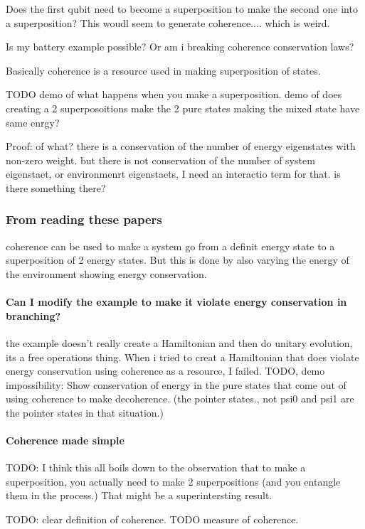 \documentclass{article}
\begin{document}
Does the first qubit need to become a superposition to make the second one into a superposition?
This woudl seem to generate coherence.... which is weird.

Is my battery example possible? Or am i breaking coherence conservation laws?



Basically coherence is a resource used in making superposition of states. 

TODO demo of what happens when you make a superposition. demo of does creating a 2 superposoitions make the 2 pure states making the mixed state have same enrgy? 


Proof: of what?
there is a conservation of the number of energy eigenstates with non-zero weight. but there is not conservation of the number of system eigenstaet, or environmenrt eigenstaets, I need an interactio term for that. is there something there?

\subsubsection{From reading these papers}
coherence can be used to make a system go from a definit energy state to a superposition of 2 energy states. But this is done by also varying the energy of the environment showing energy conservation. 

\paragraph{Can I modify the example to make it violate energy conservation in branching?} the example doesn't really create a Hamiltonian and then do unitary evolution, its a free operations thing. When i tried to creat a Hamiltonian that does violate energy conservation using coherence as a resource, I failed. TODO, demo impossibility: Show conservation of energy in the pure states that come out of using coherence to make decoherence. (the pointer states., not psi0 and psi1 are the pointer states in that situation.)

\paragraph{Coherence made simple}
TODO: I think this all boils down to the observation that to make a superposition, you actually need to make 2 superpositions (and you entangle them in the process.) That might be a superintersting result. 


TODO: clear definition of coherence.
TODO measure of coherence.
\end{document}
